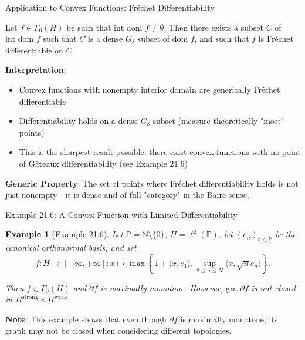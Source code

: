 \documentclass[aspectratio=169,10pt]{beamer}
\newtheorem{example}{Example}
\begin{document}
\begin{frame}{Application to Convex Functions: Fréchet Differentiability}
    \begin{corollary}[Corollary 21.28]
        Let $f \in \Gamma_0(H)$ be such that $\text{int dom } f \neq \emptyset$. Then there exists
        a subset $C$ of $\text{int dom } f$ such that $C$ is a dense $G_\delta$ subset of
        $\text{dom } f$, and such that $f$ is Fréchet differentiable on $C$.
    \end{corollary}

    \vspace{1em}
    \textbf{Interpretation}:
    \begin{itemize}
        \item Convex functions with nonempty interior domain are generically Fréchet differentiable
        \item Differentiability holds on a dense $G_\delta$ subset (measure-theoretically "most" points)
        \item This is the sharpest result possible: there exist convex functions with no
              point of Gâteaux differentiability (see Example 21.6)
    \end{itemize}

    \vspace{1em}
    \textbf{Generic Property}: The set of points where Fréchet differentiability holds
    is not just nonempty—it is dense and of full "category" in the Baire sense.
\end{frame}

\begin{frame}{Example 21.6: A Convex Function with Limited Differentiability}
    \begin{example}[Example 21.6]
        Let $\mathbb{P} = \mathbb{N} \setminus \{0\}$, $H = \ell^2(\mathbb{P})$,
        let $(e_n)_{n \in \mathbb{P}}$ be the canonical orthonormal basis, and set
        \[
            f: H \to [-\infty, +\infty]: x \mapsto \max\left\{1 + \langle x, e_1 \rangle,
                \sup_{2 \leq n \leq N} \langle x, \sqrt{n}e_n \rangle\right\}.
        \]

        Then $f \in \Gamma_0(H)$ and $\partial f$ is maximally monotone. However,
        $\text{gra } \partial f$ is not closed in $H^{\text{strong}} \times H^{\text{weak}}$.
    \end{example}

    \vspace{1em}
    \textbf{Note}: This example shows that even though $\partial f$ is maximally monotone,
    its graph may not be closed when considering different topologies.
\end{frame}
\end{document}
